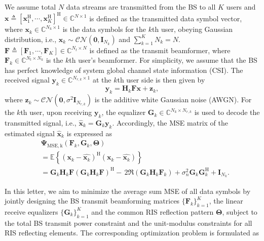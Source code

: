 \documentclass[journal]{IEEEtran}
\begin{document}
    
We assume total ${N}$ data streams are transmitted from the BS to all ${K}$ users and ${\mathbf{x}} \triangleq \left [{ {\mathbf{x}}_{1}^{\mathrm {H}}, \cdots, {\mathbf{x}}_{K}^{\mathrm {H}}}\right]^{\mathrm {H}}\in \mathbb {C}^{N \times 1}$ is defined as the transmitted data  symbol vector, where ${\mathbf{x}}_{k} \in \mathbb {C}^{N_{k} \times 1}$ is the data symbols  for the $k$th user, obeying Gaussian distribution, i.e., $\mathbf{x}_{k} \sim \mathcal {CN}(\mathbf{0}, {\mathbf{I}}_{N_{k}})$ and  $\sum _{k = 1}^{K} {N_{k}} = N$.  ${\mathbf{F}} \triangleq \left [{ {\mathbf{F}}_{1}, \cdots, {\mathbf{F}}_{K} }\right]  \in \mathbb {C}^{N_{t} \times N}$ is defined as the transmit beamformer, where ${\mathbf{F}}_{k} \in \mathbb {C}^{ N_{t} \times N_{k}}$ is  the $k$th user's beamformer. For simplicity, we assume that the BS has perfect knowledge of system global  channel state information (CSI).  The received signal ${\mathbf{y}}_{k} \in \mathbb {C}^{N_{r,k} \times 1}$ at the $k$th user side is then given by
\begin{equation} \mathbf {y}_{k} = \mathbf {H}_{k}\mathbf {F}\mathbf {x}+\mathbf {z}_{k}, \end{equation}
where $\mathbf{z}_{k} \sim \mathcal {CN}(\mathbf{0},\sigma ^{2} {\mathbf{I}}_{N_{r,k}})$ is the additive white Gaussian noise (AWGN).  For the $k$th user, upon receiving ${\mathbf{y}_{k}}$, the equalizer ${\mathbf{G}_{k}} \in \mathbb {C}^{{N}_{k} \times N_{r,k}}$ is used to decode the transmitted signal, i.e.,
$\hat {\mathbf {x}}_{k}={\mathbf{G}_{k}}\mathbf {y}_{k}$.
Accordingly, the MSE matrix of the estimated signal $\hat {\mathbf {x}}_{k}$ is expressed as
\begin{equation}\begin{aligned}
& \boldsymbol {\Psi }_{\mathrm{ MSE,k}} ({\mathbf{F}_{k}}, {\mathbf{G}_{k}}, \boldsymbol {\Theta }) \\ &=\mathbb {E} \left \lbrace{ ( {\mathbf {x}}_{k} - \hat{\mathbf{x}_{k}})^{\mathrm {H}} ( {\mathbf {x}}_{k} - \hat{\mathbf{x}_{k}})}\right \rbrace \\&= {\mathbf{G}}_{k} {\mathbf{H}}_{k} {\mathbf{F}}( {\mathbf{G}}_{k} {\mathbf{H}}_{k} {\mathbf{F}}) ^{\mathrm {H}}\!\! -\!\,2{\Re}( {\mathbf{G}}_{k} {\mathbf{H}}_{k} {\mathbf{F}}_{k})  \!   + \!\sigma _{n}^{2} {\mathbf{G}}_{k} {\mathbf{G}}_{k}^{\mathrm {H}}\!\!+\!\!{\mathbf{I}}_{{N}_{k}}.  \end{aligned}\end{equation}

In this letter, we aim to minimize the average sum MSE of all data symbols  by jointly designing the BS transmit beamforming matrices $\{ {\mathbf{F}}_{k} \}_{k=1}^{K}$, the linear receive equalizers $\{ {\mathbf{G}}_{k} \}_{k=1}^{K}$ and
the common RIS reflection pattern $\boldsymbol {\Theta }$, subject to the total BS transmit power constraint and the unit-modulus constraints for all RIS reflecting elements. The corresponding optimization problem is formulated as 
\end{document}
